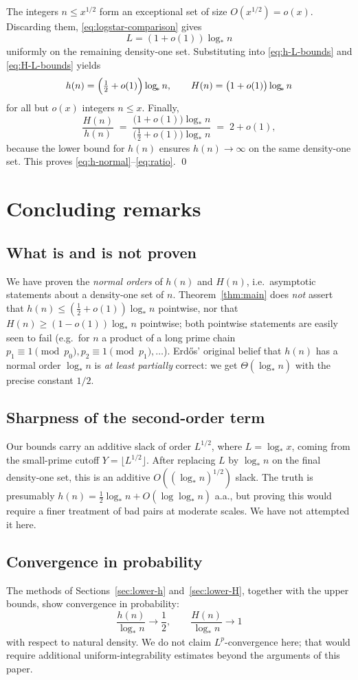 \documentclass[11pt,reqno]{amsart}
\theoremstyle{plain}
\theoremstyle{definition}
\newcommand{\logstar}{\log_{\!*}}
\begin{document}
The integers $n\le x^{1/2}$ form an exceptional set of size $O(x^{1/2})=o(x)$.
Discarding them, \eqref{eq:logstar-comparison} gives
\[
L=(1+o(1))\logstar n
\]
uniformly on the remaining density-one set. Substituting into
\eqref{eq:h-L-bounds} and \eqref{eq:H-L-bounds} yields
\[
h(n)=\Bigl(\tfrac12+o(1)\Bigr)\logstar n,
\qquad
H(n)=\bigl(1+o(1)\bigr)\logstar n
\]
for all but $o(x)$ integers $n\le x$. Finally,
\[
\frac{H(n)}{h(n)}
\;=\;
\frac{\bigl(1+o(1)\bigr)\logstar n}
{\bigl(\tfrac12+o(1)\bigr)\logstar n}
\;=\;
2+o(1),
\]
because the lower bound for $h(n)$ ensures $h(n)\to\infty$ on the same
density-one set. This proves \eqref{eq:h-normal}--\eqref{eq:ratio}. \qed

\section{Concluding remarks}\label{sec:remarks}

\subsection{What is and is not proven} We have proven the
\emph{normal orders} of $h(n)$ and $H(n)$, i.e.\ asymptotic statements about a
density-one set of $n$. Theorem~\ref{thm:main} does \emph{not} assert that
$h(n)\le (\tfrac12+o(1))\logstar n$ pointwise, nor that $H(n)\ge (1-o(1))\logstar n$
pointwise; both pointwise statements are easily seen to fail (e.g.\ for $n$ a
product of a long prime chain $p_1\equiv 1\pmod{p_0}, p_2\equiv 1\pmod{p_1},\dots$).
Erd\H{o}s' original belief that $h(n)$ has a normal order $\logstar n$ is
\emph{at least partially} correct: we get $\Theta(\logstar n)$ with the precise
constant $1/2$.

\subsection{Sharpness of the second-order term} Our bounds carry an additive
slack of order $L^{1/2}$, where $L=\logstar x$, coming from the small-prime
cutoff $Y=\lfloor L^{1/2}\rfloor$. After replacing $L$ by $\logstar n$ on the
final density-one set, this is an additive
$O((\logstar n)^{1/2})$ slack. The truth is presumably
$h(n)=\tfrac12\logstar n+O(\log\logstar n)$ a.a., but proving this would require
a finer treatment of bad pairs at moderate scales. We have not attempted it
here.

\subsection{Convergence in probability}
The methods of Sections~\ref{sec:lower-h} and~\ref{sec:lower-H}, together with
the upper bounds, show convergence in probability:
\[
\frac{h(n)}{\logstar n}\to \frac12,
\qquad
\frac{H(n)}{\logstar n}\to 1
\]
with respect to natural density. We do not claim $L^p$-convergence here; that
would require additional uniform-integrability estimates beyond the arguments
of this paper.
\end{document}
